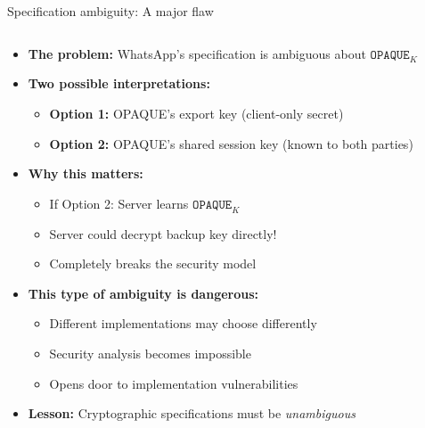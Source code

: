 \documentclass[aspectratio=169, lualatex, handout]{beamer}
\begin{document}
\begin{frame}{Specification ambiguity: A major flaw}
	\begin{columns}[c]
		\begin{column}{1\textwidth}
			\begin{itemize}
				\item \textbf{The problem:} WhatsApp's specification is ambiguous about $\mathtt{OPAQUE}_K$
				\item \textbf{Two possible interpretations:}
				      \begin{itemize}
					      \item \textbf{Option 1:} OPAQUE's export key (client-only secret)
					      \item \textbf{Option 2:} OPAQUE's shared session key (known to both parties)
				      \end{itemize}
				\item \textbf{Why this matters:}
				      \begin{itemize}
					      \item If Option 2: Server learns $\mathtt{OPAQUE}_K$
					      \item Server could decrypt backup key directly!
					      \item Completely breaks the security model
				      \end{itemize}
				\item \textbf{This type of ambiguity is dangerous:}
				      \begin{itemize}
					      \item Different implementations may choose differently
					      \item Security analysis becomes impossible
					      \item Opens door to implementation vulnerabilities
				      \end{itemize}
				\item \textbf{Lesson:} Cryptographic specifications must be \textit{unambiguous}
			\end{itemize}
		\end{column}
	\end{columns}
\end{frame}
\end{document}
